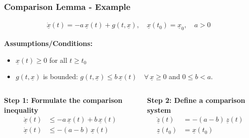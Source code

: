 \documentclass[student, noshadow, lsr, english, aspectratio=169, t]{ITR_LSR_slides}
\begin{document}

\begin{frame}
    \frametitle{Comparison Lemma - Example}

    \vspace{-0.5cm}
    \begin{tcolorbox}[title=Problem: Analyze stability of a perturbed system]
        \vspace{-0.4cm}
        \begin{align*}
            \dot{\underline{x}}(t) = -a\,\underline{x}(t) + g(t, \underline{x}), \quad \underline{x}(t_0) = \underline{x}_0, \quad a > 0
        \end{align*}
    \end{tcolorbox}

    \textbf{Assumptions/Conditions:}
    \begin{itemize}
        \item $\underline{x}(t) \geq 0$ for all $t \geq t_0$
        \item $g(t, \underline{x})$ is bounded: $g(t, \underline{x}) \leq b\,\underline{x}(t) \quad \forall\, \underline{x} \geq 0$ and $0 \leq b < a$.
    \end{itemize}

    \vspace{0.3cm}
    \begin{columns}
        \textbf{Step 1: Formulate the comparison inequality}
        \begin{align*}
            \dot{\underline{x}}(t) &\leq -a\,\underline{x}(t) + b\,\underline{x}(t) \\[0.3cm]
            \dot{\underline{x}}(t) &\leq -(a - b)\,\underline{x}(t)
        \end{align*}

        \textbf{Step 2: Define a comparison system} \\
        \begin{align*}
            \dot{\underline{z}}(t) &= -(a - b)\,\underline{z}(t) \\[0.3cm]
            \underline{z}(t_0) &= \underline{x}(t_0)
        \end{align*}
    \end{columns}
    
\end{frame}
\end{document}

